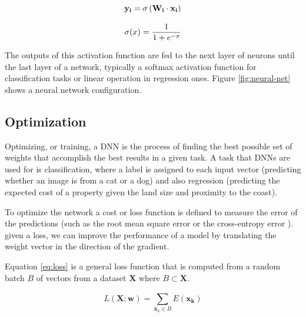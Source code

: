 \begin{equation}
    \centering
    \mathbf{y_i} = \sigma \left ( \mathbf{W_i} \cdot \mathbf{x_i} \right )
    \label{eq:neural-layer}
\end{equation}

\begin{equation}
    \centering
    \sigma (x) = \frac{1}{1 + e^{-x}} 
    \label{eq:sigmoid}
\end{equation}

The outputs of this activation function are fed to the next layer of neurons until the last layer of a network, typically a softmax activation function for classification tasks or linear operation in regression ones. Figure \ref{fig:neural-net} shows a neural network configuration.

\subsection{Optimization}

Optimizing, or training, a DNN is the process of finding the best possible set of weights that accomplish the best results in a given task. A task that DNNs are used for is classification, where a label is assigned to each input vector (predicting whether an image is from a cat or a dog) and also regression (predicting the expected cost of a property given the land size and proximity to the coast).

To optimize the network a cost or loss function is defined to measure the error of the predictions (such as the root mean square error or the cross-entropy error \cite{golik2013cross}). given a loss, we can improve the performance of a model by translating the weight vector in the direction of the gradient.

Equation \eqref{eq:loss} is a general loss function that is computed from a random batch $B$ of vectors from a dataset $\mathbf{X}$ where $B \subset \mathbf{X}$.

\begin{equation}
    L(\mathbf{X}; \mathbf{w}) = \sum_{\mathbf{x}_k \in B}^{} E (\mathbf{x_k})
    \label{eq:loss}
\end{equation}

